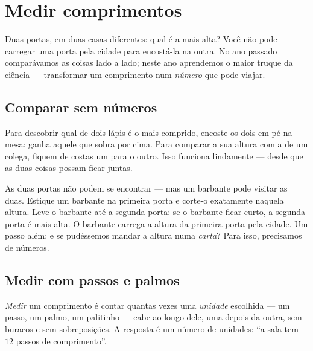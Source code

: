 \chapter{Medir comprimentos}\label{ch:g2:measuring-length}

Duas portas, em duas casas diferentes: qual é a mais alta? Você não
pode carregar uma porta pela cidade para encostá-la na outra. No ano
passado comparávamos as coisas lado a lado; neste ano aprendemos o
maior truque da ciência --- transformar um comprimento num
\emph{número} que pode viajar.

\section{Comparar sem números}

\begin{example}\label{ex:g2:measuring-length:sidebyside}
Para descobrir qual de dois lápis é o mais comprido, encoste os dois
em pé na mesa: ganha aquele que sobra por cima. Para comparar a sua
altura com a de um colega, fiquem de costas um para o outro. Isso
funciona lindamente --- desde que as duas coisas possam ficar juntas.
\end{example}

\begin{example}\label{ex:g2:measuring-length:string}
As duas portas não podem se encontrar --- mas um barbante pode
visitar as duas. Estique um barbante na primeira porta e corte-o
exatamente naquela altura. Leve o barbante até a segunda porta: se o
barbante ficar curto, a segunda porta é mais alta. O barbante carrega
a altura da primeira porta pela cidade. Um passo além: e se
pudéssemos mandar a altura numa \emph{carta}? Para isso, precisamos
de números.
\end{example}

\section{Medir com passos e palmos}

\begin{definition}\label{def:g2:measuring-length:measure}
\emph{Medir} um comprimento é contar quantas vezes uma
\emph{unidade} escolhida --- um passo, um palmo, um
palitinho --- cabe ao longo dele, uma depois da outra, sem buracos e
sem sobreposições. A resposta é um número de unidades: ``a sala tem
$12$ passos de comprimento''.
\end{definition}

